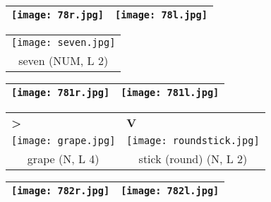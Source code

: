 \documentclass{tufte-book}
\newcommand{\sansnormal}{\sffamily\selectfont}
\begin{document}
\begin{fullwidth}
\begin{table*}[h!]
\begin{tabular}{cc}
  \end{tabular}
\end{table*}
\newpage

\begin{table}[h!]
\begin{tabular}{|c|c|}
\hline
\texttt{[image: 78r.jpg]} & \texttt{[image: 78l.jpg]}\\
\hline
\end{tabular}
\label{page:78}
\end{table}

 \begin{table*}[h!]
\begin{tabular}{c}
   \texttt{[image: seven.jpg]}\\
    seven (NUM, L 2)\\%
  
  \end{tabular}
\end{table*}

\begin{table}[h!]
\begin{tabular}{|c|c|}
\hline
\texttt{[image: 781r.jpg]} & \texttt{[image: 781l.jpg]}\\
\hline
\end{tabular}
\label{page:781}
\end{table}

 \begin{table*}[h!]
\begin{tabular}{cc}
\multicolumn{1}{l}{\textbf{>}}&\multicolumn{1}{l}{\textbf{{\sansnormal V}}}  \\
   \texttt{[image: grape.jpg]}&   \texttt{[image: roundstick.jpg]}\\
    grape (N, L 4)& stick (round) (N, L 2)\\%
  
  \end{tabular}
\end{table*}

\begin{table}[h!]
\begin{tabular}{|c|c|}
\hline
\texttt{[image: 782r.jpg]} & \texttt{[image: 782l.jpg]}\\
\hline
\end{tabular}
\label{page:782}
\end{table}


\end{fullwidth}
\end{document}

